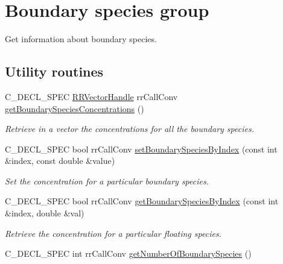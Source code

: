 \hypertarget{group__boundary}{
\section{\-Boundary species group}
\label{group__boundary}
}


\-Get information about boundary species.  


\subsection*{\-Utility routines}
\begin{DoxyCompactItemize}
\item 
\-C\-\_\-\-D\-E\-C\-L\-\_\-\-S\-P\-E\-C \hyperlink{rr__c__types_8h_aea46a16752b0ae2cd95c009030ee630e}{\-R\-R\-Vector\-Handle} \*
rr\-Call\-Conv \hyperlink{group__utility_gaae9b6b75211923bcf6f7196fe707c631}{get\-Boundary\-Species\-Concentrations} ()
\begin{DoxyCompactList}\small\item\em \-Retrieve in a vector the concentrations for all the boundary species. \end{DoxyCompactList}\item 
\-C\-\_\-\-D\-E\-C\-L\-\_\-\-S\-P\-E\-C bool rr\-Call\-Conv \hyperlink{group__utility_gabb6764fa48d0b3f2ca3b38e391479347}{set\-Boundary\-Species\-By\-Index} (const int \&index, const double \&value)
\begin{DoxyCompactList}\small\item\em \-Set the concentration for a particular boundary species. \end{DoxyCompactList}\item 
\-C\-\_\-\-D\-E\-C\-L\-\_\-\-S\-P\-E\-C bool rr\-Call\-Conv \hyperlink{group__utility_gaccee3467307dbcedd031c1dc2cf57606}{get\-Boundary\-Species\-By\-Index} (const int \&index, double \&val)
\begin{DoxyCompactList}\small\item\em \-Retrieve the concentration for a particular floating species. \end{DoxyCompactList}\item 
\hypertarget{group__utility_ga17c851dfb27b9697ff286cc57d4cd10d}{
\-C\-\_\-\-D\-E\-C\-L\-\_\-\-S\-P\-E\-C int rr\-Call\-Conv \hyperlink{group__utility_ga17c851dfb27b9697ff286cc57d4cd10d}{get\-Number\-Of\-Boundary\-Species} ()}
\label{group__utility_ga17c851dfb27b9697ff286cc57d4cd10d}


\end{DoxyCompactItemize}
